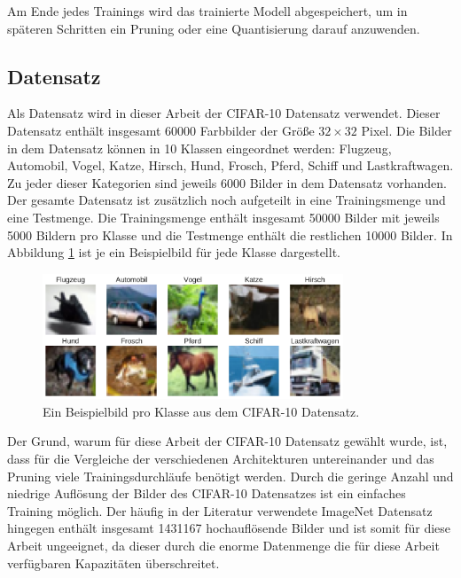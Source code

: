 Am Ende jedes Trainings wird das trainierte Modell abgespeichert, um in späteren Schritten ein Pruning oder eine Quantisierung darauf anzuwenden.


\subsection{Datensatz}
\label{datensatz}
Als Datensatz wird in dieser Arbeit der CIFAR-10 Datensatz \cite{krizhevsky_learning_2009} verwendet. Dieser Datensatz enthält insgesamt 60000 Farbbilder der Größe $32 \times 32$ Pixel. Die Bilder in dem Datensatz können in 10 Klassen eingeordnet werden: Flugzeug, Automobil, Vogel, Katze, Hirsch, Hund, Frosch, Pferd, Schiff und Lastkraftwagen. Zu jeder dieser Kategorien sind jeweils 6000 Bilder in dem Datensatz vorhanden. Der gesamte Datensatz ist zusätzlich noch aufgeteilt in eine Trainingsmenge und eine Testmenge. Die Trainingsmenge enthält insgesamt 50000 Bilder mit jeweils 5000 Bildern pro Klasse und die Testmenge enthält die restlichen 10000 Bilder. In Abbildung \ref{f3.1} ist je ein Beispielbild für jede Klasse dargestellt.

\begin{figure}[htbp]
\centerline{\includegraphics[width=0.8\textwidth]{content/images/cifar-10.pdf}}
\caption{Ein Beispielbild pro Klasse aus dem CIFAR-10 Datensatz.}
\label{f3.1}
\end{figure}

Der Grund, warum für diese Arbeit der CIFAR-10 Datensatz gewählt wurde, ist, dass für die Vergleiche der verschiedenen Architekturen untereinander und das Pruning viele Trainingsdurchläufe benötigt werden. Durch die geringe Anzahl und niedrige Auflösung der Bilder des CIFAR-10 Datensatzes ist ein einfaches Training möglich. Der häufig in der Literatur verwendete ImageNet Datensatz \cite{russakovsky_imagenet_2015} hingegen enthält insgesamt 1431167 hochauflösende Bilder und ist somit für diese Arbeit ungeeignet, da dieser durch die enorme Datenmenge die für diese Arbeit verfügbaren Kapazitäten überschreitet.



